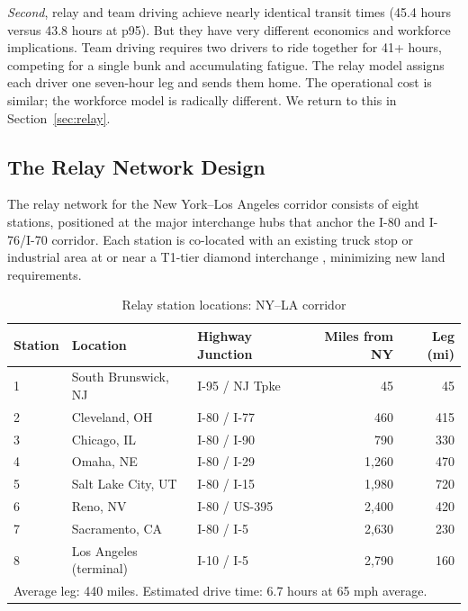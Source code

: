 \textit{Second}, relay and team driving achieve nearly identical transit times (45.4 hours
versus 43.8 hours at p95). But they have very different economics and workforce implications.
Team driving requires two drivers to ride together for 41+ hours, competing for a single bunk
and accumulating fatigue. The relay model assigns each driver one seven-hour leg and sends
them home. The operational cost is similar; the workforce model is radically different.
We return to this in Section~\ref{sec:relay}.

\subsection{The Relay Network Design}

The relay network for the New York--Los Angeles corridor consists of eight stations,
positioned at the major interchange hubs that anchor the I-80 and I-76/I-70 corridor.
Each station is co-located with an existing truck stop or industrial area at or near a
T1-tier diamond interchange \citep{ROUTE_C2}, minimizing new land requirements.

\begin{table}[h]
\centering
\caption{Relay station locations: NY--LA corridor}
\label{tab:relay_stations}
\begin{tabular}{lllrr}
\toprule
Station & Location & Highway Junction & Miles from NY & Leg (mi) \\
\midrule
1 & South Brunswick, NJ     & I-95 / NJ Tpke             &    45 &  45 \\
2 & Cleveland, OH           & I-80 / I-77                &   460 & 415 \\
3 & Chicago, IL             & I-80 / I-90                &   790 & 330 \\
4 & Omaha, NE               & I-80 / I-29                & 1,260 & 470 \\
5 & Salt Lake City, UT      & I-80 / I-15                & 1,980 & 720 \\
6 & Reno, NV                & I-80 / US-395              & 2,400 & 420 \\
7 & Sacramento, CA          & I-80 / I-5                 & 2,630 & 230 \\
8 & Los Angeles (terminal)  & I-10 / I-5                 & 2,790 & 160 \\
\bottomrule
\multicolumn{5}{l}{\footnotesize Average leg: 440 miles. Estimated drive time: 6.7 hours at 65 mph average.} \\
\end{tabular}
\end{table}

